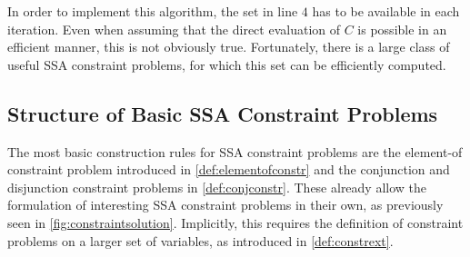     
    In order to implement this algorithm, the set in line $4$ has to be
    available in each iteration.
    Even when assuming that the direct evaluation of $C$ is possible in an
    efficient manner, this is not obviously true.
    Fortunately, there is a large class of useful SSA constraint problems, for
    which this set can be efficiently computed.

\subsection{Structure of Basic SSA Constraint Problems}

    The most basic construction rules for SSA constraint problems are the
    element-of constraint problem introduced in \autoref{def:elementofconstr}
    and the conjunction and disjunction constraint problems in
    \autoref{def:conjconstr}.
    These already allow the formulation of interesting SSA constraint problems
    in their own, as previously seen in \autoref{fig:constraintsolution}.
    Implicitly, this requires the definition of constraint problems on a
    larger set of variables, as introduced in \autoref{def:constrext}.

